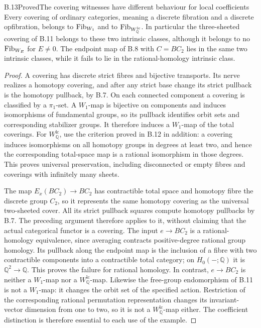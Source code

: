 \begin{claim}{B.13}{Proved}{The covering witnesses have different behaviour for local coefficients}
Every covering of ordinary categories, meaning a discrete fibration and a
discrete opfibration, belongs to $\mathrm{Fib}_{W_1}$ and to
$\mathrm{Fib}_{W_{\mathbb Q}^{\mathrm{lc}}}$. In particular the three-sheeted
covering of B.11 belongs to these two intrinsic classes, although it
belongs to no $\mathrm{Fib}_{W_E}$ for $E\ne0$.
The endpoint map of B.8 with $C=BC_2$ lies in the same two intrinsic
classes, while it fails to lie in the rational-homology intrinsic class.
\end{claim}
\begin{proof}
A covering has discrete strict fibres and bijective transports.
Its nerve realizes a homotopy covering, and after any strict base change its
strict pullback is the homotopy pullback, by B.7. On each connected component
a covering is classified by a $\pi_1$-set. A $W_1$-map is bijective on
components and induces isomorphisms of fundamental groups, so its pullback
identifies orbit sets and corresponding stabilizer groups. It therefore
induces a $W_1$-map of the total coverings. For
$W_{\mathbb Q}^{\mathrm{lc}}$, use the criterion proved in B.12 in addition:
a covering induces isomorphisms on all homotopy groups in degrees at least
two, and hence the corresponding total-space map is a rational isomorphism
in those degrees. This proves universal preservation, including disconnected
or empty fibres and coverings with infinitely many sheets.

The map $E_x(BC_2)\to BC_2$ has contractible total space and homotopy
fibre the discrete group $C_2$, so it represents the same homotopy covering
as the universal two-sheeted cover. All its strict pullback squares compute
homotopy pullbacks by B.7. The preceding argument therefore applies to it,
without claiming that the actual categorical functor is a covering.
The input $e\to BC_2$ is a rational-homology equivalence, since averaging
contracts positive-degree rational group homology. Its pullback along the
endpoint map is the inclusion of a fibre with two contractible components
into a contractible total category; on $H_0(-;\mathbb Q)$ it is
$\mathbb Q^2\to\mathbb Q$. This proves the failure for rational homology.
In contrast, $e\to BC_2$ is neither a $W_1$-map nor a
$W_{\mathbb Q}^{\mathrm{lc}}$-map. Likewise the free-group endomorphism
of B.11 is not a $W_1$-map: it changes the orbit set of the specified action.
Restriction of the corresponding rational permutation representation changes
its invariant-vector dimension from one to two, so it is not a
$W_{\mathbb Q}^{\mathrm{lc}}$-map either. The coefficient distinction is
therefore essential to each use of the example.
\end{proof}

